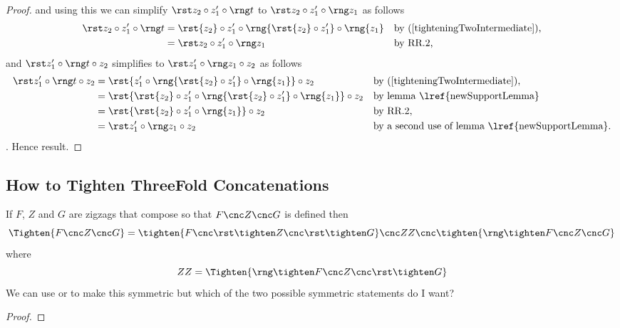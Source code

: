 {\begin{proof}
and using this we can simplify
$\longTighteningTwo$  to $\tighteningTwo$ as follows
\begin{align*}
\longTighteningTwo 
    &= \rst{z_2} \circ z'_1 \circ \rng{\rst{z_2} \circ z'_1} \circ \rng{z_1}
                   && \mbox{by (\ref{tighteningTwoIntermediate}),}\\
    &= \tighteningTwo
                   && \mbox{by RR.2,}
\end{align*}
and  $\longTighteningThree$ simplifies to $\tighteningThree$ as follows
\begin{align*}
\longTighteningThree 
     &= \rst{z'_1 \circ \rng{\rst{z_2} \circ z'_1} \circ\rng{z_1}} \circ z_2
     && \mbox{by (\ref{tighteningTwoIntermediate}),}\\
     &= \rst{\rst{z_2} \circ z'_1 \circ \rng{\rst{z_2} \circ z'_1} \circ\rng{z_1}
      } \circ z_2
     && \mbox{by  lemma \lref{newSupportLemma}}\\
     &= \rst{\rst{z_2} \circ z'_1 \circ\rng{z_1}} \circ z_2 
     && \mbox {by RR.2,}\\ 
     &= \tighteningThree
     && \mbox{by a second use of lemma \lref{newSupportLemma}.}
\end{align*}. 
Hence result.
\end{proof}

\subsection{How to Tighten ThreeFold Concatenations}
\begin{lemma}[howToTightenAThreefoldConcatenation]
If $F$, $Z$ and $G$ are zigzags that compose so that
$F \cnc Z \cnc G$ is defined then
\[
\Tighten{F \cnc Z \cnc G} = 
    \tighten{ F \cnc \abrst{{Z \cnc \abrst{G}}}}
     \cnc 
     ZZ
     \cnc
    \tighten{ \abrng{F \cnc Z} \cnc G}
\]
where
\[
ZZ=\Tighten{\abrng{F}
              \cnc
            Z
              \cnc
            \abrst{G}
           }
\]
We can use   or 
to make this symmetric but which of the two possible symmetric statements do I want?
\end{lemma}
\begin{proof}


\end{proof}}
